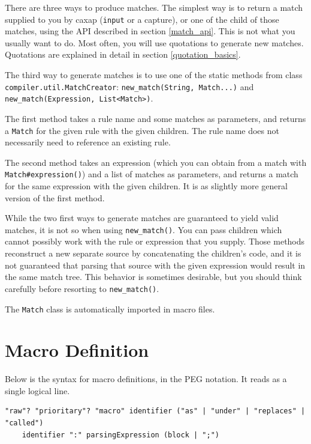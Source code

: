 There are three ways to produce matches. The simplest way is to return a match
supplied to you by caxap (\texttt{input} or a capture), or one of the child of
those matches, using the API described in section \ref{match_api}. This is not
what you usually want to do. Most often, you will use quotations to generate new
matches. Quotations are explained in detail in section \ref{quotation_basics}.

The third way to generate matches is to use one of the static methods from class
\texttt{compiler.util.MatchCreator}: \texttt{new_match(String, Match...)}  and
\texttt{new_match(Expression, List<Match>)}.

The first method takes a rule name and some matches as parameters, and returns a
\texttt{Match} for the given rule with the given children. The rule name does not
necessarily need to reference an existing rule.

The second method takes an expression (which you can obtain from a match with
\lstinline{Match#expression()}) and a list of matches as parameters, and returns
a match for the same expression with the given children. It is as slightly more
general version of the first method.

While the two first ways to generate matches are guaranteed to yield valid
matches, it is not so when using \texttt{new_match()}. You can pass children
which cannot possibly work with the rule or expression that you supply. Those
methods reconstruct a new separate source by concatenating the children's code,
and it is not guaranteed that parsing that source with the given expression
would result in the same match tree. This behavior is sometimes desirable, but
you should think carefully before resorting to \texttt{new_match()}.

The \texttt{Match} class is automatically imported in macro files.

\section{Macro Definition}

Below is the syntax for macro definitions, in the PEG notation. It reads as a
single logical line.

\begin{lstlisting}
"raw"? "prioritary"? "macro" identifier ("as" | "under" | "replaces" | "called")
    identifier ":" parsingExpression (block | ";")
\end{lstlisting}


